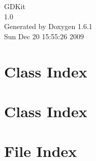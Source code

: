 \documentclass[a4paper]{book}
\begin{document}
\hypersetup{pageanchor=false}
\begin{titlepage}
\vspace*{7cm}
\begin{center}
{\Large GDKit \\[1ex]\large 1.0 }\\
\vspace*{1cm}
{\large Generated by Doxygen 1.6.1}\\
\vspace*{0.5cm}
{\small Sun Dec 20 15:55:26 2009}\\
\end{center}
\end{titlepage}
\clearemptydoublepage
{}
\tableofcontents
\clearemptydoublepage
{}
\hypersetup{pageanchor=true}
\chapter{Class Index}

\chapter{Class Index}

\chapter{File Index}

\end{document}

